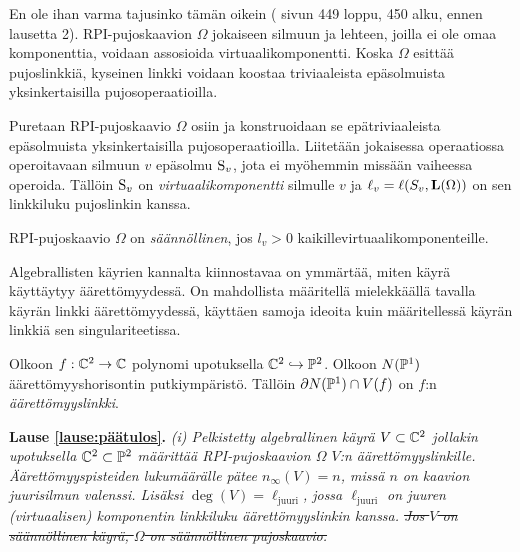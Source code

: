 En ole ihan varma tajusinko tämän oikein (\citep{Neumann1989} sivun 449 loppu, 450 alku, ennen lausetta 2). RPI-pujoskaavion $\Omega$ jokaiseen silmuun ja lehteen, joilla ei ole omaa komponenttia, voidaan assosioida virtuaalikomponentti. Koska $\Omega$ esittää pujoslinkkiä, kyseinen linkki voidaan koostaa triviaaleista epäsolmuista yksinkertaisilla pujosoperaatioilla.
\begin{maaritelma}[Virtuaalikomponentti]
    Puretaan RPI-pujoskaavio $\Omega$ osiin ja konstruoidaan se epätriviaaleista epäsolmuista yksinkertaisilla pujosoperaatioilla. Liitetään jokaisessa operaatiossa operoitavaan silmuun $v$ epäsolmu $\solmu_v$, jota ei myöhemmin missään vaiheessa operoida. Tällöin $\solmu_v$ on \emph{virtuaalikomponentti} silmulle $v$ ja $\ell_v=\ell(S_v,\linkki(\Omega))$ on sen linkkiluku pujoslinkin kanssa.
\end{maaritelma}
\begin{maaritelma}
    RPI-pujoskaavio $\Omega$ on \emph{säännöllinen}, jos $l_v>0$ kaikillevirtuaalikomponenteille.
\end{maaritelma}
Algebrallisten käyrien kannalta kiinnostavaa on ymmärtää, miten käyrä käyttäytyy äärettömyydessä. On mahdollista määritellä mielekkäällä tavalla käyrän linkki äärettömyydessä, käyttäen samoja ideoita kuin määritellessä käyrän linkkiä sen singulariteetissa.
\begin{maaritelma}
    Olkoon $f:\C^2\to\C$ polynomi upotuksella $\C^2\hookrightarrow\P^2$. Olkoon $N(\P^1)$ äärettömyyshorisontin putkiympäristö. Tällöin $\partial N(\P^1)\cap V(f)$ on $f$:n \emph{äärettömyyslinkki}.
\end{maaritelma}
\par\vspace{\topsep}
\noindent
\textbf{Lause \ref{lause:päätulos}.} \emph{(i) Pelkistetty algebrallinen käyrä $V\subset\C^2$ jollakin upotuksella $\C^2\subset\P^2$ määrittää RPI-pujoskaavion $\Omega$ $V$:n äärettömyyslinkille. Äärettömyyspisteiden lukumäärälle pätee $n_\infty(V)=n$, missä $n$ on kaavion juurisilmun valenssi. Lisäksi $\deg(V)=\ell_\text{juuri}$, jossa $\ell_\text{juuri}$ on juuren (virtuaalisen) komponentin linkkiluku äärettömyyslinkin kanssa. \sout{Jos $V$ on säännöllinen käyrä, $\Omega$ on säännöllinen pujoskaavio.}}

